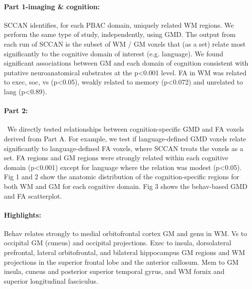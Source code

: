 \documentclass{llncs}
\begin{document}
\paragraph{Part 1-imaging \& cognition:} SCCAN identifies, for each PBAC domain, uniquely related WM regions. We perform the same type of study, independently, using GMD. The output from each run of SCCAN is the subset of WM / GM voxels that (as a set) relate most significantly to the cognitive domain of interest (e.g. language).
\newline
\newline
 We found significant associations between GM and each domain of
cognition consistent with putative neuroanatomical substrates at the
p<0.001 level. FA in WM was related to exec, soc, vs (p<0.05), weakly
related to memory (p<0.072) and unrelated to lang (p<0.89).
\newline
\paragraph{Part 2:}~We directly tested relationships between
 cognition-specific GMD and FA voxels derived from Part A. For
 example, we test if language-defined GMD voxels relate significantly
 to language-defined FA voxels, where SCCAN treats the voxels as a
 set.
\newline
\newline
 FA regions and GM regions were strongly related within each cognitive
domain (p<0.001) except for language where the relation was modest
(p<0.05). Fig 1 and 2 show the anatomic distribution of the
cognition-specific regions for both WM and GM for each cognitive
domain. Fig 3 shows the behav-based GMD and FA scatterplot.
\newline
\paragraph{Highlights:} Behav relates strongly to medial orbitofrontal cortex GM and genu in WM. Vs to occipital GM (cuneus) and occipital projections. Exec to insula, dorsolateral prefrontal, lateral orbitofrontal, and bilateral hippocampus GM regions and WM projections in the superior frontal lobe and the anterior callosum. Mem to GM insula, cuneus and posterior superior temporal gyrus, and WM fornix and superior longitudinal fasciculus.
\end{document}
